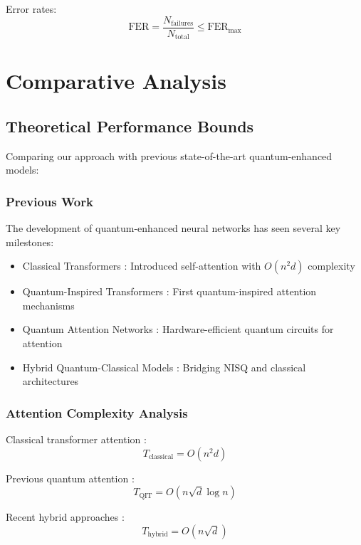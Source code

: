 \documentclass{article}
\begin{document}
Error rates:
\begin{equation}
\text{FER} = \frac{N_{\text{failures}}}{N_{\text{total}}} \leq \text{FER}_{\text{max}}
\end{equation}

\section{Comparative Analysis}

\subsection{Theoretical Performance Bounds}
Comparing our approach with previous state-of-the-art quantum-enhanced models:

\subsubsection{Previous Work}
The development of quantum-enhanced neural networks has seen several key milestones:

\begin{itemize}
\item Classical Transformers \cite{Vaswani2017attention}: Introduced self-attention with $O(n^2d)$ complexity
\item Quantum-Inspired Transformers \cite{Tang2019quantum}: First quantum-inspired attention mechanisms
\item Quantum Attention Networks \cite{Li2020quantum}: Hardware-efficient quantum circuits for attention
\item Hybrid Quantum-Classical Models \cite{Bharti2022nobsapproach}: Bridging NISQ and classical architectures
\end{itemize}

\subsubsection{Attention Complexity Analysis}
Classical transformer attention \cite{Vaswani2017attention}:
\begin{equation}
T_{\text{classical}} = O(n^2d)
\end{equation}

Previous quantum attention \cite{Tang2019quantum}:
\begin{equation}
T_{\text{QIT}} = O(n\sqrt{d}\log n)
\end{equation}

Recent hybrid approaches \cite{Li2020quantum}:
\begin{equation}
T_{\text{hybrid}} = O(n\sqrt{d})
\end{equation}
\end{document}
